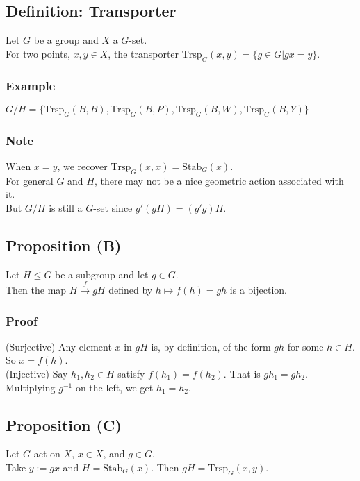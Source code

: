 \documentclass[11pt]{article}
\newcommand{\0}{\emptyset}
\begin{document}
\subsection*{Definition: Transporter}
\label{sec:org00c82cb}
Let \(G\) be a group and \(X\) a \(G\)-set.\\[0pt]
For two points, \(x,y\in X\), the transporter \(\text{Trsp}_{G}(x,y)=\{g\in G|gx=y\}\).\\[0pt]
\subsubsection*{Example}
\label{sec:orgf4fe8d7}
\(G/H=\{\text{Trsp}_{G}(B,B),\text{Trsp}_{G}(B,P),\text{Trsp}_{G}(B,W),\text{Trsp}_{G}(B,Y)\}\)\\[0pt]
\subsubsection*{Note}
\label{sec:orgb0df3fe}
When \(x=y\), we recover \(\text{Trsp}_{G}(x,x)=\text{Stab}_{G}(x)\).\\[0pt]
For general \(G\) and \(H\), there may not be a nice geometric action associated with it.\\[0pt]
But \(G/H\) is still a \(G\)-set since \(g'(gH)=(g'g)H\).\\[0pt]
\subsection*{Proposition (B)}
\label{sec:org3d026bf}
Let \(H\leq G\) be a subgroup and let \(g\in G\).\\[0pt]
Then the map \(H\overset{f}{\to}gH\) defined by \(h\mapsto f(h)=gh\) is a bijection.\\[0pt]
\subsubsection*{Proof}
\label{sec:org7f465b7}
(Surjective) Any element \(x\) in \(gH\) is, by definition, of the form \(gh\) for some \(h\in H\). So \(x=f(h)\).\\[0pt]
(Injective) Say \(h_{1},h_{2}\in H\) satisfy \(f(h_{1})=f(h_{2})\). That is \(gh_{1}=gh_{2}\). Multiplying \(g^{-1}\) on the left, we get \(h_{1}=h_{2}\).\\[0pt]
\subsection*{Proposition (C)}
\label{sec:org7107105}
Let \(G\) act on \(X\), \(x\in X\), and \(g\in G\).\\[0pt]
Take \(y:=gx\) and \(H=\text{Stab}_{G}(x)\). Then \(gH=\text{Trsp}_{G}(x,y)\).\\[0pt]
\end{document}
